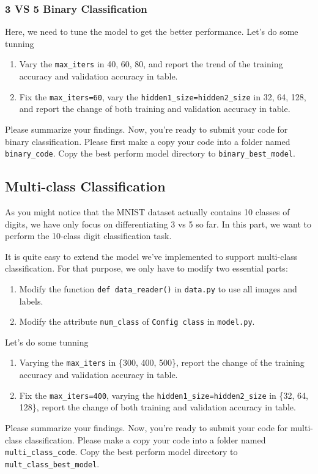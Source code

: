 \documentclass[letterpaper]{article}
\begin{document}
\subsubsection{3 VS 5 Binary Classification}
Here, we need to tune the model to get the better performance.
Let's do some tunning
\begin{enumerate}
	\item Vary the \verb|max_iters| in {40, 60, 80}, and report the trend of the training
		accuracy and validation accuracy in table.
	\item Fix the \verb|max_iters=60|, vary the \verb|hidden1_size=hidden2_size|
		in {32, 64, 128}, and report
		the change of both training and validation accuracy in table.
\end{enumerate}
Please summarize your findings.
Now, you're ready to submit your code for binary classification. Please first
make a copy your code into a folder named \verb|binary_code|.
Copy the best perform model directory to \verb|binary_best_model|.

\subsection{Multi-class Classification}
As you might notice that the MNIST dataset actually contains 10 classes of digits,
we have only focus on differentiating 3 vs 5 so far. In this part, we want to
perform the 10-class digit classification task.

It is quite easy to extend the model we've implemented to support multi-class
classification. For that purpose, we only have to modify two essential parts:
\begin{enumerate}
	\item Modify the function \verb|def data_reader()| in \verb|data.py| to use
		all images and labels.
	\item Modify the attribute \verb|num_class| of \verb|Config class| in
		\verb|model.py|.
\end{enumerate}
Let's do some tunning
\begin{enumerate}
	\item Varying the \verb|max_iters| in \{300, 400, 500\}, report the change of the training
		accuracy and validation accuracy in table.
	\item Fix the \verb|max_iters=400|, varying the
		\verb|hidden1_size=hidden2_size| in \{32, 64, 128\}, report
		the change of both training and validation accuracy in table.
\end{enumerate}
Please summarize your findings.
Now, you're ready to submit your code for multi-class classification. Please 
make a copy your code into a folder named \verb|multi_class_code|.
Copy the best perform model directory to \verb|mult_class_best_model|.
\end{document}
